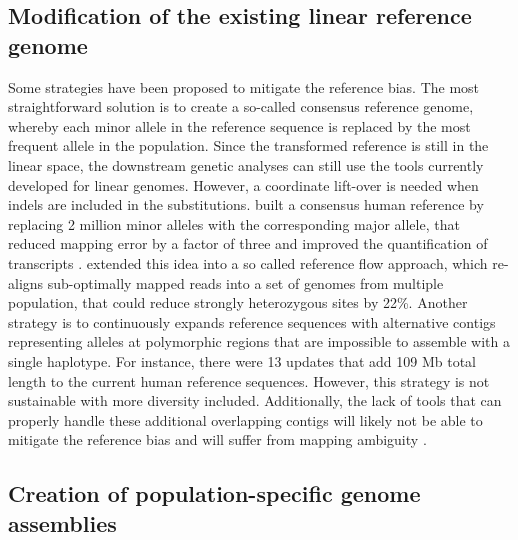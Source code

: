 \documentclass[../main.tex]{subfiles}
\begin{document}
\subsection*{Modification of the existing linear reference genome}

Some strategies have been proposed to mitigate the reference bias. The most straightforward solution is to create a so-called consensus reference genome, whereby each minor allele in the reference sequence is replaced by the most frequent allele in the population. Since the transformed reference is still in the linear space, the downstream genetic analyses can still use the tools currently developed for linear genomes. However, a coordinate lift-over is needed when indels are included in the substitutions. \citet{ballouz2019time} built a consensus human reference by replacing 2 million minor alleles with the corresponding major allele, that reduced mapping error by a factor of three and improved the quantification of transcripts \citep{kaminow2020virtue}. \citet{chen2021reference} extended this idea into a so called reference flow approach, which re-aligns sub-optimally mapped reads into a set of genomes from multiple population, that could reduce strongly heterozygous sites by 22\%. Another strategy is to continuously expands reference sequences with alternative contigs representing alleles at polymorphic regions that are impossible to assemble with a single haplotype. For instance, there were 13 updates that add 109 Mb total length to the current human reference sequences. However, this strategy is not sustainable with more diversity included. Additionally, the lack of tools that can properly handle these additional overlapping contigs will likely not be able to mitigate the reference bias and will suffer from mapping ambiguity \citep{sherman2020pan}. 

\subsection*{Creation of population-specific genome assemblies}
\end{document}
